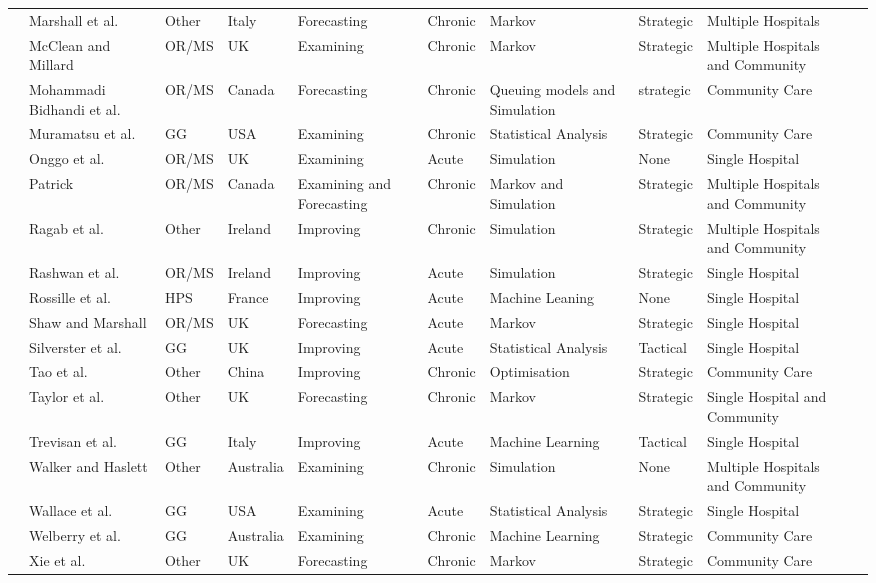 \documentclass[thesis.tex]{subfiles}
\begin{document}
\begin{landscape}
\begin{table}[H]
{\begin{tabular}{@{}llllllllll@{}}
   \cite{Marshall3} &Marshall et al.&Other& Italy &Forecasting&Chronic&Markov&Strategic&Multiple Hospitals\\
  \cite{McClean} &McClean and Millard& OR/MS& UK &Examining&Chronic&Markov&Strategic&Multiple Hospitals and Community\\
\cite{Bidhandi} & Mohammadi Bidhandi et al.&OR/MS&Canada&Forecasting&Chronic&Queuing models and Simulation&strategic&Community Care\\
   \cite{Muramatsu} &Muramatsu et al.&GG&USA& Examining&Chronic&Statistical Analysis&Strategic&Community Care\\
  \cite{Onggo} &Onggo et al.&OR/MS&UK&Examining&Acute&Simulation&None&Single Hospital\\   
  \cite{Patrick}  &Patrick&OR/MS&Canada&Examining and Forecasting&Chronic&Markov and Simulation&Strategic&Multiple Hospitals and Community\\
  \cite{Ragab}  &Ragab et al.& Other&Ireland&Improving&Chronic&Simulation&Strategic&Multiple Hospitals and Community\\
  \cite{Rashwan}  &Rashwan et al.&OR/MS&Ireland&Improving&Acute&Simulation&Strategic&Single Hospital\\
  \cite{Rossille}  &Rossille et al.&HPS &France&Improving&Acute&Machine Leaning&None&Single Hospital\\
  \cite{Shaw} &Shaw and Marshall&OR/MS&UK& Forecasting&Acute&Markov&Strategic&Single Hospital\\
  \cite{Silvester}  &Silverster et al.&GG&UK&Improving&Acute&Statistical Analysis&Tactical&Single Hospital\\
  \cite{Tao}  &Tao et al.& Other&China&Improving&Chronic&Optimisation&Strategic&Community Care\\
  \cite{Taylor}  &Taylor et al.&Other&UK&Forecasting&Chronic&Markov&Strategic&Single Hospital and Community\\
   \cite{Trevisan} &Trevisan et al. &GG&Italy&Improving&Acute&Machine Learning&Tactical&Single Hospital\\
   \cite{Walker} &Walker and Haslett& Other& Australia&Examining&Chronic&Simulation&None&Multiple Hospitals and Community\\
   \cite{Wallace} &Wallace et al.&GG&USA&Examining&Acute&Statistical Analysis&Strategic&Single Hospital\\
  \cite{Welberry}  &Welberry et al.&GG&Australia&Examining&Chronic&Machine Learning&Strategic&Community Care\\
  \cite{Xie}  &Xie et al.&Other&UK &Forecasting&Chronic&Markov&Strategic&Community Care\\

\end{tabular}}
\end{table}
\end{landscape}
\end{document}
